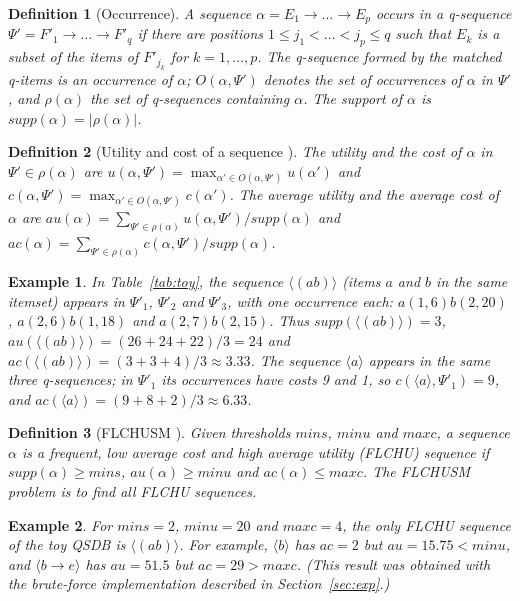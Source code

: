\documentclass[pdflatex,sn-mathphys,Numbered]{sn-jnl}
\theoremstyle{thmstyleone}
\theoremstyle{thmstyletwo}
\newtheorem{example}{Example}
\theoremstyle{thmstylethree}
\newtheorem{definition}{Definition}
\newcommand{\supp}{\ensuremath{\mathit{supp}}}
\newcommand{\au}{\ensuremath{\mathit{au}}}
\newcommand{\ac}{\ensuremath{\mathit{ac}}}
\newcommand{\minu}{\ensuremath{\mathit{minu}}}
\newcommand{\maxc}{\ensuremath{\mathit{maxc}}}
\newcommand{\mins}{\ensuremath{\mathit{mins}}}
\newcommand{\seq}[1]{\langle #1\rangle}
\begin{document}
\begin{definition}[Occurrence]
A sequence $\alpha = E_1 \to \dots \to E_p$ occurs in a q-sequence
$\Psi' = F'_1 \to \dots \to F'_q$ if there are positions $1 \le j_1 < \dots < j_p \le q$ such
that $E_k$ is a subset of the items of $F'_{j_k}$ for $k = 1, \dots, p$. The q-sequence formed
by the matched q-items is an occurrence of $\alpha$; $O(\alpha,\Psi')$ denotes the set of
occurrences of $\alpha$ in $\Psi'$, and $\rho(\alpha)$ the set of q-sequences containing
$\alpha$. The support of $\alpha$ is $\supp(\alpha) = |\rho(\alpha)|$.
\end{definition}

\begin{definition}[Utility and cost of a sequence {\cite[Def.~4]{truong2022}}]
The utility and the cost of $\alpha$ in $\Psi' \in \rho(\alpha)$ are
$u(\alpha,\Psi') = \max_{\alpha' \in O(\alpha,\Psi')} u(\alpha')$ and
$c(\alpha,\Psi') = \max_{\alpha' \in O(\alpha,\Psi')} c(\alpha')$. The average utility and the
average cost of $\alpha$ are
$\au(\alpha) = \sum_{\Psi' \in \rho(\alpha)} u(\alpha,\Psi') / \supp(\alpha)$ and
$\ac(\alpha) = \sum_{\Psi' \in \rho(\alpha)} c(\alpha,\Psi') / \supp(\alpha)$.
\end{definition}

\begin{example}
In Table~\ref{tab:toy}, the sequence $\seq{(ab)}$ (items $a$ and $b$ in the same itemset)
appears in $\Psi'_1$, $\Psi'_2$ and $\Psi'_3$, with one occurrence each:
$a(1,6)b(2,20)$, $a(2,6)b(1,18)$ and $a(2,7)b(2,15)$. Thus $\supp(\seq{(ab)}) = 3$,
$\au(\seq{(ab)}) = (26 + 24 + 22)/3 = 24$ and $\ac(\seq{(ab)}) = (3 + 3 + 4)/3 \approx 3.33$.
The sequence $\seq{a}$ appears in the same three q-sequences; in $\Psi'_1$ its occurrences have
costs 9 and 1, so $c(\seq{a},\Psi'_1) = 9$, and $\ac(\seq{a}) = (9 + 8 + 2)/3 \approx 6.33$.
\end{example}

\begin{definition}[FLCHUSM {\cite{truong2022}}]
Given thresholds $\mins$, $\minu$ and $\maxc$, a sequence $\alpha$ is a frequent, low average
cost and high average utility (FLCHU) sequence if $\supp(\alpha) \ge \mins$,
$\au(\alpha) \ge \minu$ and $\ac(\alpha) \le \maxc$. The FLCHUSM problem is to find all FLCHU
sequences.
\end{definition}

\begin{example}\label{ex:result}
For $\mins = 2$, $\minu = 20$ and $\maxc = 4$, the only FLCHU sequence of the toy QSDB is
$\seq{(ab)}$. For example, $\seq{b}$ has $\ac = 2$ but $\au = 15.75 < \minu$, and
$\seq{b \to e}$ has $\au = 51.5$ but $\ac = 29 > \maxc$. (This result was obtained with the
brute-force implementation described in Section~\ref{sec:exp}.)
\end{example}
\end{document}
